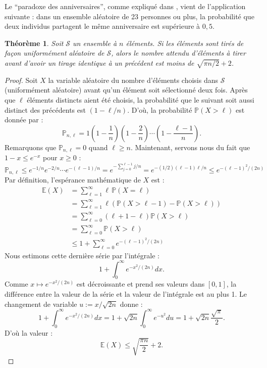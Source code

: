 \documentclass[a4paper, titlepage]{article}
\newtheorem{theo}{Théorème}[section]
\theoremstyle{definition}
\theoremstyle{remark}
\begin{document}
Le ``paradoxe des anniversaires'', comme expliqué dans \cite[sous-section 14.1]{galbraith2012}, vient de l'application suivante : dans un ensemble aléatoire de 23 personnes ou plus, la probabilité que deux individus partagent le même anniversaire est supérieure à $0,5$.

\begin{theo}\label{paradoxeAnniversaire}
Soit $\mathcal S$ un ensemble à $n$ éléments. Si les éléments sont tirés de façon uniformément aléatoire de $\mathcal S$, alors le nombre attendu d'éléments à tirer avant d'avoir un tirage identique à un précédent est moins de $\sqrt{\pi n /2} + 2$.
\end{theo}

\begin{proof}
Soit $X$ la variable aléatoire du nombre d'éléments choisis dans $\mathcal S$ (uniformément aléatoire) avant qu'un élément soit sélectionné deux fois. Après que $\ell$ éléments distincts aient été choisis, la probabilité que le suivant soit aussi distinct des précédents est $(1-\ell/n)$. D'où, la probabilité $\mathbb{P}(X > \ell)$ est donnée par :
$$\mathbb{P}_{n,\ell} = 1\left(1-\frac{1}{n}\right)\left(1-\frac{2}{n}\right)\cdots\left(1-\frac{\ell-1}{n}\right).$$
Remarquons que $\mathbb{P}_{n,\ell} = 0$ quand $ \ell \geqslant n$. Maintenant, servons nous du fait que $1-x \leqslant e^{-x}$ pour $ x \geqslant 0$ :
$$\mathbb{P}_{n,\ell} \leqslant e^{-1/n}e^{-2/n}\cdots e^{-(\ell-1)/n} = e^{-\sum_{j=0}^{\ell -1} j/n} = e^{-(1/2)(\ell-1)\ell/n} \leqslant e^{-(\ell-1)^2/(2n)}$$
Par définition, l'espérance mathématique de $X$ est :
\begin{align*}
\mathbb{E}(X) &= \sum_{\ell = 1}^\infty \ell \, \mathbb{P}(X=\ell) \\
&= \sum_{\ell = 1}^\infty \ell \left(\mathbb{P}(X>\ell -1) - \mathbb{P}(X>\ell) \right)\\
&= \sum_{\ell = 0}^\infty (\ell + 1 -\ell)\mathbb{P}(X>\ell)\\
&= \sum_{\ell = 0}^\infty \mathbb{P}(X>\ell)\\
&\leqslant 1 + \sum_{\ell = 0}^\infty e^{-(\ell-1)^2/(2n)}
\end{align*}
Nous estimons cette dernière série par l'intégrale :
$$1 + \int_0^\infty e^{-x^2/(2n)}dx.$$
Comme $x \mapsto e^{-x^2/(2n)}$ est décroissante et prend ses valeurs dans $[0,1]$, la différence entre la valeur de la série et la valeur de l'intégrale est au plus 1. Le changement de variable $u := x/\sqrt{2n}$ donne :
$$1 + \int_0^\infty e^{-x^2/(2n)}dx = 1 + \sqrt{2n}\int_0^\infty e^{-u^2}du = 1 + \sqrt{2n}\frac{\sqrt{\pi}}{2}.$$
D'où la valeur :
$$\mathbb{E}(X) \leqslant \sqrt{\frac{\pi n}{2}} + 2.$$
\end{proof}

\newpage


\end{document}
